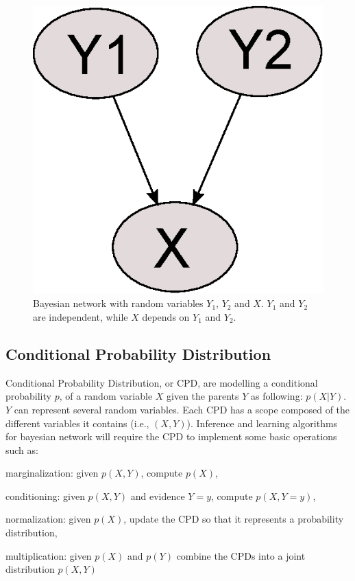 \documentclass[11pt]{article}
\begin{document}
\begin{figure}[h]
\centering
\includegraphics{img/bn1.eps}
\caption{Bayesian network with random variables $Y_1$, $Y_2$ and $X$. $Y_1$ and $Y_2$ are independent, while $X$ depends on $Y_1$ and $Y_2$.}
\label{bn1}
\end{figure}



\subsection{Conditional Probability Distribution}
Conditional Probability Distribution, or CPD, are modelling a conditional probability $p$, of a random variable $X$ given the parents $Y$ as following: $p(X|Y)$. $Y$ can represent several random variables. Each CPD has a scope composed of the different variables it contains (i.e., $(X,Y)$). Inference and learning algorithms for bayesian network will require the CPD to implement some basic operations such as:
\begin{compactitem}
\item marginalization: given $p(X,Y)$, compute $p(X)$,
\item conditioning: given $p(X,Y)$ and evidence $Y=y$, compute $p(X,Y=y)$,
\item normalization: given $p(X)$, update the CPD so that it represents a probability distribution,
\item multiplication: given $p(X)$ and $p(Y)$ combine the CPDs into a joint distribution $p(X,Y)$
\end{compactitem}
\end{document}
